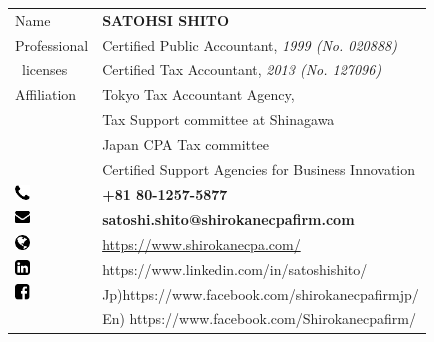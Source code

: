 \begin{table}[h]
  \begin{tabular}{lll}
Name & {\sffamily \bfseries SATOHSI SHITO} & \\
Professional & \multicolumn{2}{l}{Certified Public Accountant, \textit{1999 (No. 020888)}} \\
\ licenses       & \multicolumn{2}{l}{Certified Tax Accountant, \textit{2013 (No. 127096)}} \\
Affiliation  & \multicolumn{2}{l}{Tokyo Tax Accountant Agency,} \\
 & \multicolumn{2}{l}{Tax Support committee at Shinagawa} \\
         & \multicolumn{2}{l}{Japan CPA Tax committee} \\
         & \multicolumn{2}{l}{Certified Support Agencies for Business Innovation} \\
\includegraphics[width=4mm]{phone.png} & {\sffamily \bfseries +81 80-1257-5877} & \\
\includegraphics[width=4mm]{mail.png} & {\sffamily \bfseries satoshi.shito@shirokanecpafirm.com} & \\
\includegraphics[width=4mm]{website.png} & \multicolumn{2}{l}{\href{https://www.shirokanecpa.com/}{ https://www.shirokanecpa.com/}} \\
\includegraphics[width=4mm]{linkedin.png} & \multicolumn{2}{l}{https://www.linkedin.com/in/satoshishito/} \\    
\includegraphics[width=4mm]{facebook.png} & \multicolumn{2}{l}{Jp)https://www.facebook.com/shirokanecpafirmjp/} \\
            & \multicolumn{2}{l}{En) https://www.facebook.com/Shirokanecpafirm/} \\   
  \end{tabular}
\end{table}

